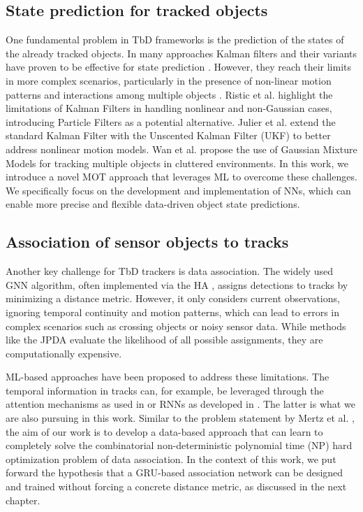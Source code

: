 \documentclass[letterpaper, 10 pt, journal, twoside]{IEEEtran}
\begin{document}
\subsection{State prediction for tracked objects}
One fundamental problem in \ac{TbD} frameworks is the prediction of the states of the already tracked objects.
In many approaches Kalman filters and their variants have proven to be effective for state prediction {\cite{KF_simple_cues.2022, KF_Bewley.2016, KF_framework.2013}}.
However, they reach their limits in more complex scenarios, particularly in the presence of non-linear motion patterns and interactions among multiple objects {\cite{KF_Ristic.2004,KF_Julier.2004,KF_Wan.2000}}.
Ristic et al. {\cite{KF_Ristic.2004}} highlight the limitations of Kalman Filters in handling nonlinear and non-Gaussian cases, introducing Particle Filters as a potential alternative.
Julier et al. {\cite{KF_Julier.2004}} extend the standard Kalman Filter with the Unscented Kalman Filter (UKF) to better address nonlinear motion models.
Wan et al. {\cite{KF_Wan.2000}} propose the use of Gaussian Mixture Models for tracking multiple objects in cluttered environments.
In this work, we introduce a novel \ac{MOT} approach that leverages \ac{ML} to overcome these challenges.
We specifically focus on the development and implementation of \acp{NN}, which can enable more precise and flexible data-driven object state predictions.

\subsection{Association of sensor objects to tracks}
Another key challenge for \ac{TbD} trackers is data association.
The widely used \ac{GNN} algorithm, often implemented via the \ac{HA} {\cite{DA_hungarian.1955}}, assigns detections to tracks by minimizing a distance metric.
However, it only considers current observations, ignoring temporal continuity and motion patterns, which can lead to errors in complex scenarios such as crossing objects or noisy sensor data.
While methods like the \ac{JPDA} {\cite{DA_JPDA.1993}} evaluate the likelihood of all possible assignments, they are computationally expensive.

\ac{ML}-based approaches have been proposed to address these limitations.
The temporal information in tracks can, for example, be leveraged through the attention mechanisms as used in {\cite{DL_ATT_CNN_soda.2020, DL_CNN_ATT_mot.2017}} or \acp{RNN} as developed in {\cite{DL_RNN_mot.2016, DL_RNN_data_association.2019}}.
The latter is what we are also pursuing in this work.
Similar to the problem statement by Mertz et al. {\cite{DL_RNN_data_association.2019}}, the aim of our work is to develop a data-based approach that can learn to completely solve the combinatorial non-deterministic polynomial time (NP) hard optimization problem of data association.
In the context of this work, we put forward the hypothesis that a \ac{GRU}-based association network can be designed and trained without forcing a concrete distance metric, as discussed in the next chapter.
\end{document}
